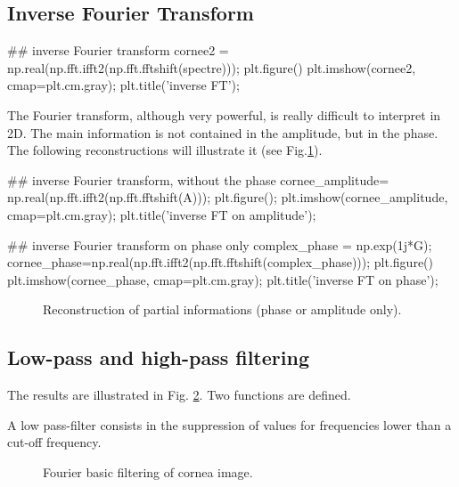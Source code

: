  
\subsection{Inverse Fourier Transform}

\begin{python}
## inverse Fourier transform
cornee2 = np.real(np.fft.ifft2(np.fft.fftshift(spectre)));
plt.figure()
plt.imshow(cornee2, cmap=plt.cm.gray);
plt.title('inverse FT');
\end{python}

The Fourier transform, although very powerful, is really difficult to interpret in 2D. The main information is not contained in the amplitude, but in the phase. The following reconstructions will illustrate it (see Fig.\ref{fig:partial}).

\begin{python}
## inverse Fourier transform, without the phase
cornee_amplitude=  np.real(np.fft.ifft2(np.fft.fftshift(A)));
plt.figure();
plt.imshow(cornee_amplitude, cmap=plt.cm.gray);
plt.title('inverse FT on amplitude');
\end{python}

\begin{python}
## inverse Fourier transform on phase only
complex_phase = np.exp(1j*G);
cornee_phase=np.real(np.fft.ifft2(np.fft.fftshift(complex_phase)));
plt.figure()
plt.imshow(cornee_phase, cmap=plt.cm.gray);
plt.title('inverse FT on phase');
\end{python}

\begin{figure}[htbp]
 \centering\caption{Reconstruction of partial informations (phase or amplitude only).}%
 \hfill
 \label{fig:partial}%
\end{figure}


\subsection{Low-pass and high-pass filtering}
The results are illustrated in Fig. \ref{fig:fourier:python:filters}. Two functions are defined.


A low pass-filter consists in the suppression of values for frequencies lower than a cut-off frequency.

\begin{figure}[H]
	\centering\caption{Fourier basic filtering of cornea image.}%
	\hfill
	\label{fig:fourier:python:filters}%
\end{figure}

